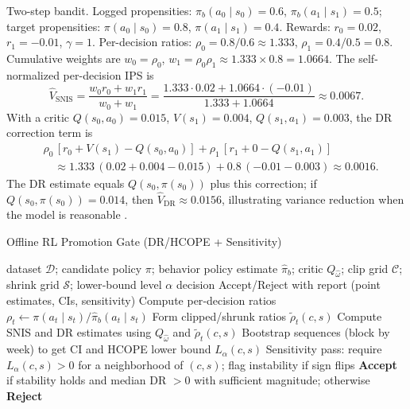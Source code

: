 \begin{example}
Two-step bandit. Logged propensities: $\pi_b(a_0\mid s_0)=0.6$, $\pi_b(a_1\mid s_1)=0.5$; target propensities: $\pi(a_0\mid s_0)=0.8$, $\pi(a_1\mid s_1)=0.4$. Rewards: $r_0=0.02$, $r_1=-0.01$, $\gamma=1$. Per-decision ratios: $\rho_0=0.8/0.6\approx1.333$, $\rho_1=0.4/0.5=0.8$. Cumulative weights are $w_0=\rho_0$, $w_1=\rho_0\rho_1\approx1.333\times0.8=1.0664$. The self-normalized per-decision IPS is
\[\hat V_{\text{SNIS}}=\frac{w_0 r_0 + w_1 r_1}{w_0+w_1}=\frac{1.333\cdot0.02 + 1.0664\cdot(-0.01)}{1.333+1.0664}\approx 0.0067.\]
With a critic $Q(s_0,a_0)=0.015$, $V(s_1)=0.004$, $Q(s_1,a_1)=0.003$, the DR correction term is
\[\begin{aligned}
&\rho_0\,[r_0+V(s_1)-Q(s_0,a_0)] + \rho_1\,[r_1+0-Q(s_1,a_1)]\\
&\quad\approx 1.333\,(0.02+0.004-0.015) + 0.8\,(-0.01-0.003) \approx 0.0016.
\end{aligned}\]
The DR estimate equals $Q(s_0,\pi(s_0))$ plus this correction; if $Q(s_0,\pi(s_0))\!=\!0.014$, then $\hat V_{\text{DR}}\approx 0.0156$, illustrating variance reduction when the model is reasonable \citep{dudik2014,jiang2016}.
\end{example}

\begin{algorithm}[t]
  \caption{Offline RL Promotion Gate (DR/HCOPE + Sensitivity)}
  \label{alg:ope-gate}
  \begin{algorithmic}[1]
    \Require dataset $\mathcal D$; candidate policy $\pi$; behavior policy estimate $\hat\pi_b$; critic $Q_{\hat\omega}$; clip grid $\mathcal C$; shrink grid $\mathcal S$; lower‑bound level $\alpha$
    \Ensure decision Accept/Reject with report (point estimates, CIs, sensitivity)
    \State Compute per‑decision ratios $\rho_t\leftarrow\pi(a_t\mid s_t)/\hat\pi_b(a_t\mid s_t)$
      \State Form clipped/shrunk ratios $\tilde\rho_t(c,s)$
      \State Compute SNIS and DR estimates using $Q_{\hat\omega}$ and $\tilde\rho_t(c,s)$
      \State Bootstrap sequences (block by week) to get CI and HCOPE lower bound $L_{\alpha}(c,s)$
    \EndFor
    \State Sensitivity pass: require $L_{\alpha}(c,s)>0$ for a neighborhood of $(c,s)$; flag instability if sign flips
    \State \textbf{Accept} if stability holds and median DR $>0$ with sufficient magnitude; otherwise \textbf{Reject}
  \end{algorithmic}
\end{algorithm}

